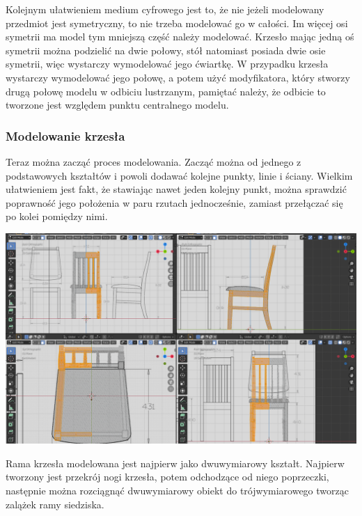 \documentclass{article} %
\begin{document}
            Kolejnym ułatwieniem medium cyfrowego jest to, że nie jeżeli modelowany przedmiot jest symetryczny, to nie trzeba modelować go w całości. Im więcej osi symetrii ma model tym mniejszą część należy modelować. Krzesło mając jedną oś symetrii można podzielić na dwie połowy, stół natomiast posiada dwie osie symetrii, więc wystarczy wymodelować jego ćwiartkę. W przypadku krzesła wystarczy wymodelować jego połowę, a potem użyć modyfikatora, który stworzy drugą połowę modelu w odbiciu lustrzanym, pamiętać należy, że odbicie to tworzone jest względem punktu centralnego modelu.
            \\
            
            \subsubsection*{Modelowanie krzesła}
            Teraz można zacząć proces modelowania. Zacząć można od jednego z podstawowych kształtów i powoli dodawać kolejne punkty, linie i ściany. Wielkim ułatwieniem jest fakt, że stawiając nawet jeden kolejny punkt, można sprawdzić poprawność jego położenia w paru rzutach jednocześnie, zamiast przełączać się po kolei pomiędzy nimi.
            \\
            
            \begin{center}
            \includegraphics[scale=0.28,keepaspectratio=true]{images/screenshots/work/5-modelowanie-mebli_004.png}
            \end{center}
            
            Rama krzesła modelowana jest najpierw jako dwuwymiarowy kształt. Najpierw tworzony jest przekrój nogi krzesła, potem odchodzące od niego poprzeczki, następnie można rozciągnąć dwuwymiarowy obiekt do trójwymiarowego tworząc zalążek ramy siedziska.
            \\
            
\end{document}
